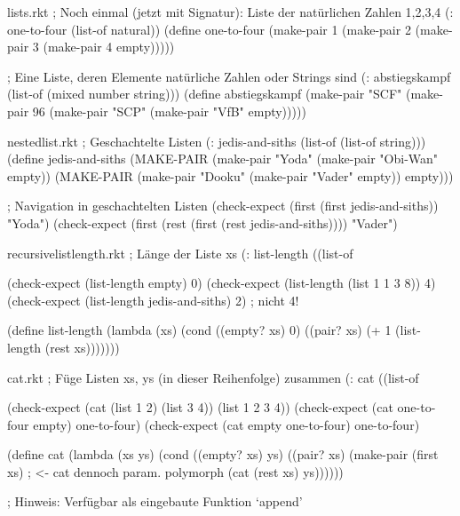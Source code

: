 \begin{filecontents*}{lists.rkt}
; Noch einmal (jetzt mit Signatur): Liste der natürlichen Zahlen 1,2,3,4
(: one-to-four (list-of natural))
(define one-to-four
  (make-pair 1
             (make-pair 2
                        (make-pair 3
                                   (make-pair 4
                                              empty)))))


; Eine Liste, deren Elemente natürliche Zahlen oder Strings sind
(: abstiegskampf (list-of (mixed number string)))
(define abstiegskampf
  (make-pair "SCF"
             (make-pair 96
                        (make-pair "SCP"
                                   (make-pair "VfB" empty)))))


\end{filecontents*}
\begin{filecontents*}{nestedlist.rkt}
; Geschachtelte Listen
(: jedis-and-siths (list-of (list-of string)))
(define jedis-and-siths
  (MAKE-PAIR (make-pair "Yoda"
                        (make-pair "Obi-Wan" empty))
             (MAKE-PAIR (make-pair "Dooku"
                                   (make-pair "Vader" empty))
                        empty)))

; Navigation in geschachtelten Listen
(check-expect (first (first jedis-and-siths)) "Yoda")
(check-expect (first (rest (first (rest jedis-and-siths)))) "Vader")
\end{filecontents*}
\begin{filecontents*}{recursivelistlength.rkt}
; Länge der Liste xs
(: list-length ((list-of %

(check-expect (list-length empty) 0)
(check-expect (list-length (list 1 1 3 8)) 4)
(check-expect (list-length jedis-and-siths) 2)    ; nicht 4!

(define list-length
  (lambda (xs)
    (cond ((empty? xs) 0)
          ((pair? xs) (+ 1 
                         (list-length (rest xs)))))))
\end{filecontents*}
\begin{filecontents*}{cat.rkt}
; Füge Listen xs, ys (in dieser Reihenfolge) zusammen
(: cat ((list-of %

(check-expect (cat (list 1 2) (list 3 4)) (list 1 2 3 4))
(check-expect (cat one-to-four empty) one-to-four)
(check-expect (cat empty one-to-four) one-to-four)

(define cat
  (lambda (xs ys)
    (cond ((empty? xs) 
           ys)
            ((pair? xs)
             (make-pair (first xs) ; <- cat dennoch param. polymorph
                        (cat (rest xs) ys))))))

; Hinweis: Verfügbar als eingebaute Funktion `append'
\end{filecontents*}
